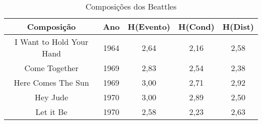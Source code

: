 \begin{table}[]
\centering
\caption{Composições dos Beattles}
\begin{tabular}{|c|c|c|c|c|}
\hline
\rowcolor[HTML]{9B9B9B} 
{\color[HTML]{FFFFFF} Composição} & {\color[HTML]{FFFFFF} Ano} & {\color[HTML]{FFFFFF} H(Evento)} & {\color[HTML]{FFFFFF} H(Cond)} & {\color[HTML]{FFFFFF} H(Dist)} \\ \hline
I Want to Hold Your Hand          & 1964                       & 2,64                             & 2,16                           & 2,58                           \\ \hline
Come Together                     & 1969                       & 2,83                             & 2,54                           & 2,38                           \\ \hline
Here Comes The Sun                & 1969                       & 3,00                             & 2,71                           & 2,92                           \\ \hline
Hey Jude                          & 1970                       & 3,00                             & 2,89                           & 2,50                           \\ \hline
Let it Be                         & 1970                       & 2,58                             & 2,23                           & 2,63                           \\ \hline
\end{tabular}
\end{table}

